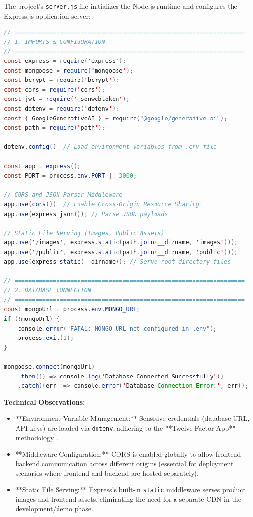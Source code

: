 \documentclass[12pt, a4paper]{report}
\begin{document}
The project's \texttt{server.js} file initializes the Node.js runtime and configures the Express.js application server:

\begin{lstlisting}[language=Java, caption=Node.js Server Initialization (server.js)]
// ==================================================================
// 1. IMPORTS & CONFIGURATION
// ==================================================================
const express = require('express');
const mongoose = require('mongoose');
const bcrypt = require('bcrypt');
const cors = require('cors');
const jwt = require('jsonwebtoken');
const dotenv = require('dotenv');
const { GoogleGenerativeAI } = require("@google/generative-ai");
const path = require('path');

dotenv.config(); // Load environment variables from .env file

const app = express();
const PORT = process.env.PORT || 3000;

// CORS and JSON Parser Middleware
app.use(cors()); // Enable Cross-Origin Resource Sharing
app.use(express.json()); // Parse JSON payloads

// Static File Serving (Images, Public Assets)
app.use('/images', express.static(path.join(__dirname, 'images')));
app.use('/public', express.static(path.join(__dirname, 'public')));
app.use(express.static(__dirname)); // Serve root directory files

// ==================================================================
// 2. DATABASE CONNECTION
// ==================================================================
const mongoUrl = process.env.MONGO_URL;
if (!mongoUrl) {
    console.error("FATAL: MONGO_URL not configured in .env");
    process.exit(1);
}

mongoose.connect(mongoUrl)
    .then(() => console.log('Database Connected Successfully'))
    .catch((err) => console.error('Database Connection Error:', err));
\end{lstlisting}

\textbf{Technical Observations:}
\begin{itemize}
    \item **Environment Variable Management:** Sensitive credentials (database URL, API keys) are loaded via \texttt{dotenv}, adhering to the **Twelve-Factor App** methodology \cite{twelvefactor}.
    \item **Middleware Configuration:** CORS is enabled globally to allow frontend-backend communication across different origins (essential for deployment scenarios where frontend and backend are hosted separately).
    \item **Static File Serving:** Express's built-in \texttt{static} middleware serves product images and frontend assets, eliminating the need for a separate CDN in the development/demo phase.
\end{itemize}
\end{document}

